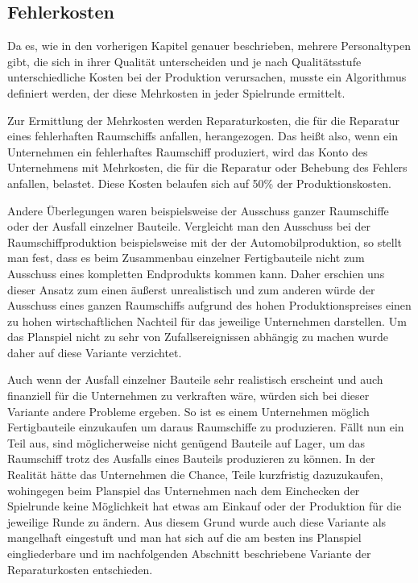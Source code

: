 \subsection{Fehlerkosten}
\label{sub:spielwelt-logik-fehlerkosten}

Da es, wie in den vorherigen Kapitel genauer beschrieben, mehrere Personaltypen gibt,
die sich in ihrer Qualität unterscheiden und je nach Qualitätsstufe unterschiedliche
Kosten bei der Produktion verursachen, musste ein Algorithmus definiert werden, der diese
Mehrkosten in jeder Spielrunde ermittelt.

Zur Ermittlung der Mehrkosten werden Reparaturkosten, die für die Reparatur eines
fehlerhaften Raumschiffs anfallen, herangezogen. Das heißt also, wenn ein Unternehmen
ein fehlerhaftes Raumschiff produziert, wird das Konto des Unternehmens mit Mehrkosten,
die für die Reparatur oder Behebung des Fehlers anfallen, belastet. Diese Kosten belaufen sich
auf 50\% der Produktionskosten.

Andere Überlegungen waren beispielsweise der Ausschuss ganzer Raumschiffe oder der Ausfall
einzelner Bauteile. Vergleicht man den Ausschuss bei der Raumschiffproduktion beispielsweise
mit der der Automobilproduktion, so stellt man fest, dass es beim Zusammenbau einzelner
Fertigbauteile nicht zum Ausschuss eines kompletten Endprodukts kommen kann. Daher erschien
uns dieser Ansatz zum einen äußerst unrealistisch und zum anderen würde der Ausschuss eines
ganzen Raumschiffs aufgrund des hohen Produktionspreises einen zu hohen wirtschaftlichen Nachteil
für das jeweilige Unternehmen darstellen. Um das Planspiel nicht zu sehr von Zufallsereignissen
abhängig zu machen wurde daher auf diese Variante verzichtet.

Auch wenn der Ausfall einzelner Bauteile sehr realistisch erscheint und auch finanziell für die
Unternehmen zu verkraften wäre, würden sich bei dieser Variante andere Probleme ergeben. So ist es
einem Unternehmen möglich Fertigbauteile einzukaufen um daraus Raumschiffe zu produzieren. Fällt
nun ein Teil aus, sind möglicherweise nicht genügend Bauteile auf Lager, um das Raumschiff trotz
des Ausfalls eines Bauteils produzieren zu können. In der Realität hätte das Unternehmen die Chance,
Teile kurzfristig dazuzukaufen, wohingegen beim Planspiel das Unternehmen nach dem Einchecken der
Spielrunde keine Möglichkeit hat etwas am Einkauf oder der Produktion für die jeweilige Runde zu ändern.
Aus diesem Grund wurde auch diese Variante als mangelhaft eingestuft und man hat sich auf die am besten
ins Planspiel eingliederbare und im nachfolgenden Abschnitt beschriebene Variante der Reparaturkosten
entschieden.

